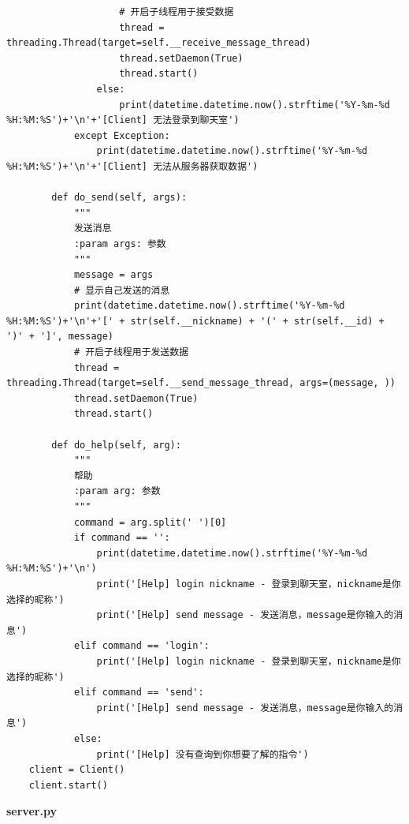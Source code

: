 \documentclass[UTF8,a4paper]{article}
\begin{document}
\begin{lstlisting}
                    # 开启子线程用于接受数据
                    thread = threading.Thread(target=self.__receive_message_thread)
                    thread.setDaemon(True)
                    thread.start()
                else:
                    print(datetime.datetime.now().strftime('%Y-%m-%d %H:%M:%S')+'\n'+'[Client] 无法登录到聊天室')
            except Exception:
                print(datetime.datetime.now().strftime('%Y-%m-%d %H:%M:%S')+'\n'+'[Client] 无法从服务器获取数据')
    
        def do_send(self, args):
            """
            发送消息
            :param args: 参数
            """
            message = args
            # 显示自己发送的消息
            print(datetime.datetime.now().strftime('%Y-%m-%d %H:%M:%S')+'\n'+'[' + str(self.__nickname) + '(' + str(self.__id) + ')' + ']', message)
            # 开启子线程用于发送数据
            thread = threading.Thread(target=self.__send_message_thread, args=(message, ))
            thread.setDaemon(True)
            thread.start()
    
        def do_help(self, arg):
            """
            帮助
            :param arg: 参数
            """
            command = arg.split(' ')[0]
            if command == '':
                print(datetime.datetime.now().strftime('%Y-%m-%d %H:%M:%S')+'\n')
                print('[Help] login nickname - 登录到聊天室，nickname是你选择的昵称')
                print('[Help] send message - 发送消息，message是你输入的消息')
            elif command == 'login':
                print('[Help] login nickname - 登录到聊天室，nickname是你选择的昵称')
            elif command == 'send':
                print('[Help] send message - 发送消息，message是你输入的消息')
            else:
                print('[Help] 没有查询到你想要了解的指令')
    client = Client()
    client.start()
\end{lstlisting}
\textbf{server.py}
\end{document}
